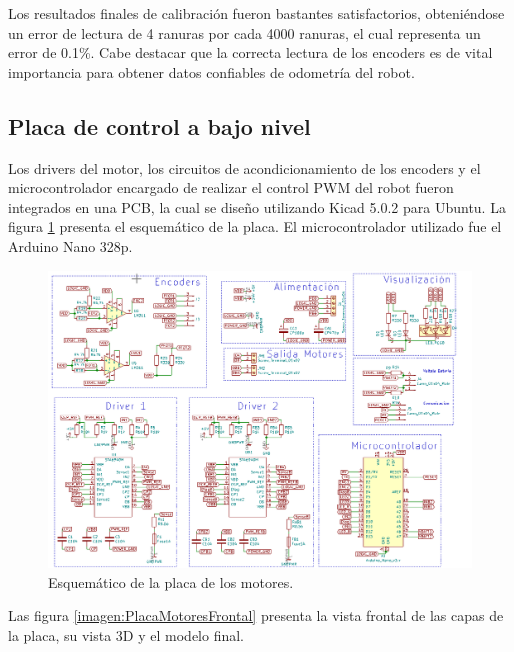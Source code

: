 Los resultados finales de calibración fueron bastantes satisfactorios, obteniéndose un error de lectura de 4 ranuras por cada 4000 ranuras, el cual representa un error de 0.1\%.
Cabe destacar que la correcta lectura de los encoders es de vital importancia para obtener datos confiables de odometría del robot.

\subsection{Placa de control a bajo nivel}
Los drivers del motor, los circuitos de acondicionamiento de los encoders y el microcontrolador encargado de realizar el control PWM del robot fueron integrados en una PCB, la cual se diseño utilizando Kicad 5.0.2 para Ubuntu. La figura \ref{imagen:PlacaMotores} presenta el esquemático de la placa. El microcontrolador utilizado fue el Arduino Nano 328p.


\begin{figure}[H]
	\centering		\includegraphics[width=1.0\linewidth]{imagenes/prototipo/Placa/PlacaMotores}
	\caption[Esquemático de la placa de los motores]{Esquemático de la placa de los motores.}
	\label{imagen:PlacaMotores}
\end{figure}

Las figura \ref{imagen:PlacaMotoresFrontal} presenta la vista frontal de las capas de la placa, su vista 3D y el modelo final.




